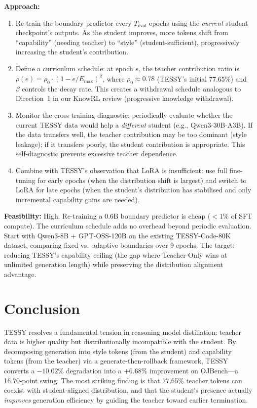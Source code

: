 \documentclass[11pt]{article}
\begin{document}
\textbf{Approach:}
\begin{enumerate}
    \item Re-train the boundary predictor every $T_{\mathrm{eval}}$ epochs using the \textit{current} student checkpoint's outputs. As the student improves, more tokens shift from ``capability'' (needing teacher) to ``style'' (student-sufficient), progressively increasing the student's contribution.

    \item Define a curriculum schedule: at epoch $e$, the teacher contribution ratio is $\rho(e) = \rho_0 \cdot (1 - e / E_{\mathrm{max}})^\beta$, where $\rho_0 \approx 0.78$ (TESSY's initial 77.65\%) and $\beta$ controls the decay rate. This creates a withdrawal schedule analogous to Direction~1 in our KnowRL review (progressive knowledge withdrawal).

    \item Monitor the cross-training diagnostic: periodically evaluate whether the current TESSY data would help a \textit{different} student (e.g., Qwen3-30B-A3B). If the data transfers well, the teacher contribution may be too dominant (style leakage); if it transfers poorly, the student contribution is appropriate. This self-diagnostic prevents excessive teacher dependence.

    \item Combine with TESSY's observation that LoRA is insufficient: use full fine-tuning for early epochs (when the distribution shift is largest) and switch to LoRA for late epochs (when the student's distribution has stabilised and only incremental capability gains are needed).
\end{enumerate}

\textbf{Feasibility:} High. Re-training a 0.6B boundary predictor is cheap ($< 1\%$ of SFT compute). The curriculum schedule adds no overhead beyond periodic evaluation. Start with Qwen3-8B + GPT-OSS-120B on the existing TESSY-Code-80K dataset, comparing fixed vs.\ adaptive boundaries over 9 epochs. The target: reducing TESSY's capability ceiling (the gap where Teacher-Only wins at unlimited generation length) while preserving the distribution alignment advantage.

\section{Conclusion}

TESSY resolves a fundamental tension in reasoning model distillation: teacher data is higher quality but distributionally incompatible with the student. By decomposing generation into style tokens (from the student) and capability tokens (from the teacher) via a generate-then-rollback framework, TESSY converts a $-10.02\%$ degradation into a $+6.68\%$ improvement on OJBench---a 16.70-point swing. The most striking finding is that 77.65\% teacher tokens can coexist with student-aligned distribution, and that the student's presence actually \textit{improves} generation efficiency by guiding the teacher toward earlier termination.
\end{document}
